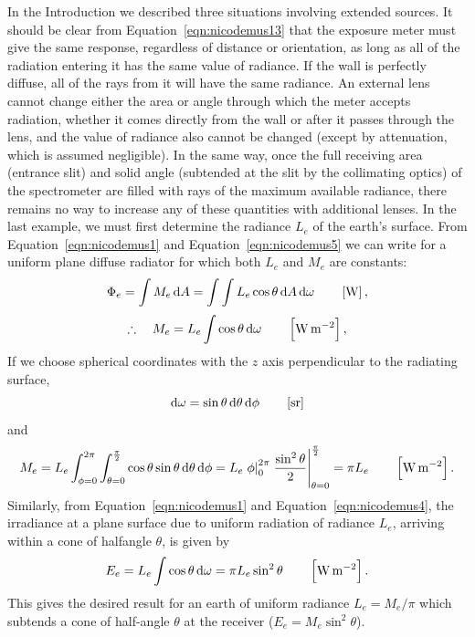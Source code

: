 In the Introduction we described three situations involving extended sources.
It should be clear from Equation~\ref{eqn:nicodemus13} that the exposure meter must
give the same response, regardless of distance or orientation, as long as all
of the radiation entering it has the same value of radiance. If the wall
is perfectly diffuse, all of the rays from it will have the same radiance.
An external lens cannot change either the area or angle through which the
meter accepts radiation, whether it comes directly from the wall or after it
passes through the lens, and the value of radiance also cannot be changed
(except by attenuation, which is assumed negligible). In the same way, once
the full receiving area (entrance slit) and solid angle (subtended at the
slit by the collimating optics) of the spectrometer are filled with rays of
the maximum available radiance, there remains no way to increase any of these
quantities with additional lenses. In the last example, we must first determine
the radiance $L_e$ of the earth’s surface.
From Equation~\ref{eqn:nicodemus1} and Equation~\ref{eqn:nicodemus5} we can write
for a uniform plane diffuse radiator for which both $L_e$ and $M_e$ are constants:
\begin{equation*}
\Phi_e = \int M_e \mathop{}\!\mathrm{d} A = \int \int L_e \cos\theta \mathop{}\!\mathrm{d} A \mathop{}\!\mathrm{d} \omega
\qquad \left[\si{\watt}\right],
\end{equation*}
\begin{equation}
\therefore\quad M_e = L_e \int \cos\theta \mathop{}\!\mathrm{d} \omega
\qquad \left[\si{\watt\per\square\meter}\right],
\end{equation}
If we choose spherical coordinates with the $z$ axis perpendicular to the
radiating surface,
\begin{equation*}
\d \omega = \sin\theta\d\theta \d \phi
\qquad \left[\si{\steradian}\right]
\end{equation*}
and
\begin{equation}
M_e = L_e \int_{\phi = 0}^{2\pi} \int_{\theta=0}^{\frac{\pi}{2}}\cos\theta
\sin\theta\d\theta \d\phi
= L_e \left.\phi\right|_{0}^{2\pi} \left.\frac{\sin^2\theta}{2}\right|_{\theta=0}^{\frac{\pi}{2}} = \pi L_e
\qquad \left[\si{\watt\per\square\meter}\right].
\end{equation}
Similarly, from Equation~\ref{eqn:nicodemus1} and Equation~\ref{eqn:nicodemus4},
the irradiance at a plane surface due to uniform radiation of radiance $L_e$,
arriving within a cone of halfangle $\theta$, is given by
\begin{equation}
E_e = L_e \int \cos\theta \mathop{}\!\mathrm{d}\omega = \pi L_e \sin^2\theta
\qquad \left[\si{\watt\per\square\meter}\right].
\end{equation}
This gives the desired result for an earth of uniform radiance
$L_e = M_e / \pi$ which subtends a cone of half-angle $\theta$ at the
receiver ($E_e = M_e \sin^2\theta$).


